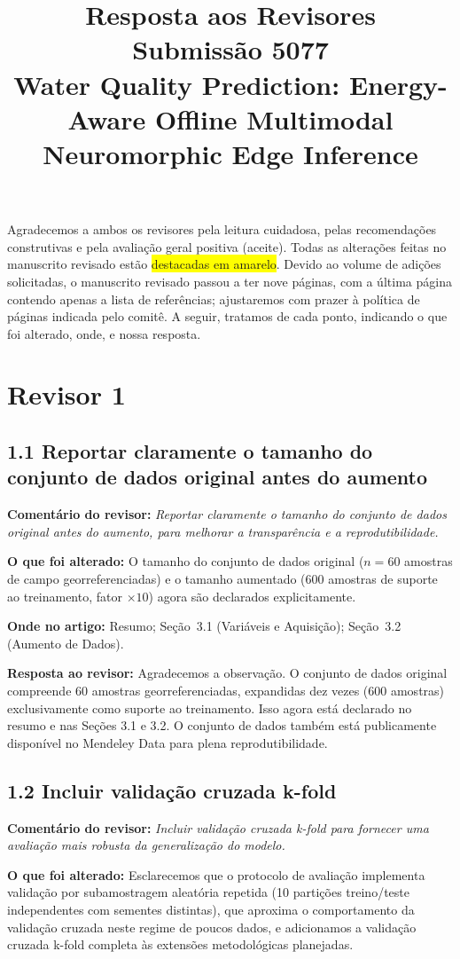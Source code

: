 \documentclass[11pt,a4paper]{article}
\title{Resposta aos Revisores\\[2mm]
\large Submissão 5077\\[1mm]
Water Quality Prediction: Energy-Aware Offline Multimodal Neuromorphic Edge Inference}
\author{}
\date{}
\newcommand{\comment}[1]{\textbf{Comentário do revisor:} \textit{#1}}
\newcommand{\change}[1]{\textbf{O que foi alterado:} #1}
\newcommand{\where}[1]{\textbf{Onde no artigo:} #1}
\newcommand{\resp}[1]{\textbf{Resposta ao revisor:} \textcolor{revblue}{#1}}
\newcommand{\pt}[1]{\subsection*{#1}}
\begin{document}
\maketitle

Agradecemos a ambos os revisores pela leitura cuidadosa, pelas recomendações construtivas e pela avaliação geral positiva (aceite). Todas as alterações feitas no manuscrito revisado estão \colorbox{yellow}{destacadas em amarelo}. Devido ao volume de adições solicitadas, o manuscrito revisado passou a ter nove páginas, com a última página contendo apenas a lista de referências; ajustaremos com prazer à política de páginas indicada pelo comitê. A seguir, tratamos de cada ponto, indicando o que foi alterado, onde, e nossa resposta.

\section*{Revisor 1}

\pt{1.1 Reportar claramente o tamanho do conjunto de dados original antes do aumento}
\comment{Reportar claramente o tamanho do conjunto de dados original antes do aumento, para melhorar a transparência e a reprodutibilidade.}

\change{O tamanho do conjunto de dados original ($n=60$ amostras de campo georreferenciadas) e o tamanho aumentado (600 amostras de suporte ao treinamento, fator $\times 10$) agora são declarados explicitamente.}

\where{Resumo; Seção~3.1 (Variáveis e Aquisição); Seção~3.2 (Aumento de Dados).}

\resp{Agradecemos a observação. O conjunto de dados original compreende 60 amostras georreferenciadas, expandidas dez vezes (600 amostras) exclusivamente como suporte ao treinamento. Isso agora está declarado no resumo e nas Seções 3.1 e 3.2. O conjunto de dados também está publicamente disponível no Mendeley Data para plena reprodutibilidade.}

\pt{1.2 Incluir validação cruzada k-fold}
\comment{Incluir validação cruzada k-fold para fornecer uma avaliação mais robusta da generalização do modelo.}

\change{Esclarecemos que o protocolo de avaliação implementa validação por subamostragem aleatória repetida (10 partições treino/teste independentes com sementes distintas), que aproxima o comportamento da validação cruzada neste regime de poucos dados, e adicionamos a validação cruzada k-fold completa às extensões metodológicas planejadas.}
\end{document}
